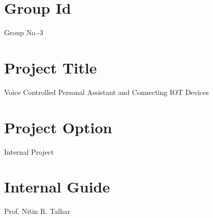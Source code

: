 \documentclass[16pt,oneside,a4paper]{article}
\begin{document}
\section{Group Id}
Group No.-3

\section{Project Title}
Voice Controlled Personal Assistant and Connecting IOT Devices
\section{ Project Option }
Internal Project

\section{Internal Guide}
Prof. Nitin R. Talhar
\end{document}
